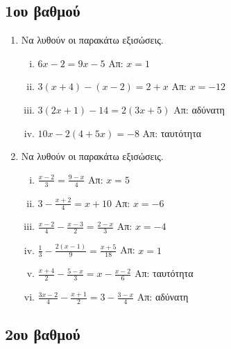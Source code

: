 \documentclass[a4paper,table]{report}
\begin{document}
\begin{center}
  \minibox{\large\bfseries  \textcolor{Col1}{Εξισώσεις}}
\end{center}

\subsection*{1ου βαθμού}

\begin{enumerate}
  \item  Να λυθούν οι παρακάτω εξισώσεις.
    \begin{enumerate}[i)]
      \item $ 6x-2=9x-5 $ \hfill Απ: $ x=1 $
      \item $ 3(x+4)-(x-2) = 2+x $ \hfill Απ: $ x=-12 $ 
      \item $ 3(2x+1) - 14 = 2(3x+5) $ \hfill Απ: αδύνατη 
      \item $ 10x-2(4+5x) =-8 $ \hfill Απ: ταυτότητα 
    \end{enumerate}

  \item  Να λυθούν οι παρακάτω εξισώσεις.
    \begin{enumerate}[i)]
      \item $ \frac{x-2}{3} = \frac{9-x}{4} $ \hfill Απ: $ x=5 $ 
      \item $ 3 - \frac{x+2}{4} = x+10 $ \hfill Απ: $ x=-6 $ 
      \item $ \frac{x-2}{4} - \frac{x-3}{2} = \frac{2-x}{3} $ \hfill Απ: $ x=-4 $ 
      \item $ \frac{1}{3} - \frac{2(x-1)}{9} = \frac{x+5}{18} $ \hfill Απ: $ x=1 $ 
      \item $ \frac{x+4}{2} - \frac{5-x}{3} = x - \frac{x-2}{6} $ \hfill Απ: ταυτότητα
      \item $ \frac{3x-2}{4} - \frac{x+1}{2} = 3 - \frac{3-x}{4} $ \hfill Απ: αδύνατη 
    \end{enumerate}
\end{enumerate}

\subsection*{2ου βαθμού}
\end{document}
